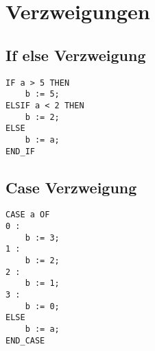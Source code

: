 


\section{Verzweigungen}
\subsection{If else Verzweigung}
\begin{lstlisting}
IF a > 5 THEN
    b := 5;
ELSIF a < 2 THEN
    b := 2;
ELSE
    b := a;
END_IF
\end{lstlisting}

\subsection{Case Verzweigung}
\begin{lstlisting}
CASE a OF
0 :
    b := 3;
1 :
    b := 2;
2 :
    b := 1;
3 :
    b := 0;
ELSE
    b := a;
END_CASE
\end{lstlisting}
